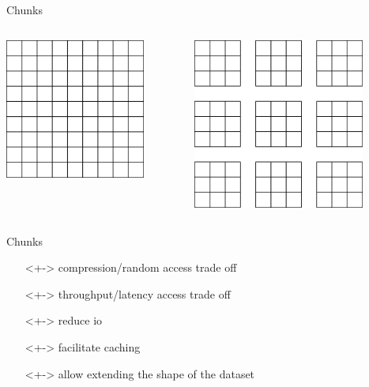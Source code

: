 \documentclass{beamer}
\begin{document}
\begin{frame}{Chunks}
  \begin{columns}[c]
    \begin{center}
      \includegraphics[width=0.8\textwidth]{images/contig-data.png}
    \end{center}

    \includegraphics[width=0.8\textwidth]{images/block-chunks.png}
  \end{columns}
\end{frame}

\begin{frame}{Chunks}
  \begin{itemize}
  \item[]<+-> compression/random access trade off
  \item[]<+-> throughput/latency access trade off
  \item[]<+-> reduce io
  \item[]<+-> facilitate caching
  \item[]<+-> allow extending the shape of the dataset
  \end{itemize}
\end{frame}
\end{document}

